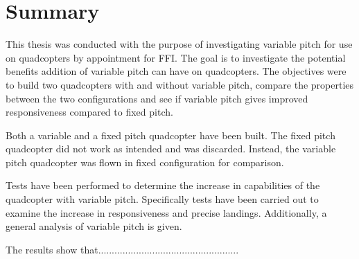 \chapter*{Summary}

This thesis was conducted with the purpose of investigating variable pitch for use on quadcopters by appointment for FFI. The goal is to investigate the potential benefits addition of variable pitch can have on quadcopters. The objectives were to build two quadcopters with and without variable pitch, compare the properties between the two configurations and see if variable pitch gives improved responsiveness compared to fixed pitch.  \bigskip

Both a variable and a fixed pitch quadcopter have been built. The fixed pitch quadcopter did not work as intended and was discarded. Instead,  the variable pitch quadcopter was flown in fixed configuration for comparison.\bigskip 

Tests have been performed to determine the increase in capabilities of the quadcopter with variable pitch. Specifically tests have been carried out to examine the increase in responsiveness and precise landings. Additionally, a general analysis of variable pitch is given.\bigskip

The results show that....................................................

















